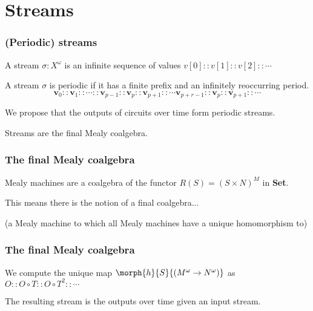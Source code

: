 \section{Streams}

\begin{frame}
    \frametitle{(Periodic) streams}

    \pause

    A stream $\sigma : X^\omega$ is an \alert{infinite sequence} of values $v[0] :: v[1] :: v[2] :: \cdots$

    \pause

    A stream $\sigma$ is \alert{periodic} if it has a finite \alert{prefix} and an infinitely reoccurring \alert{period}.
    \[ \textbf{v}_0 :: \textbf{v}_1 :: \cdots :: \textbf{v}_{p-1} :: \textbf{v}_{p} :: \textbf{v}_{p+1} :: \cdots \textbf{v}_{p+r-1} :: \textbf{v}_{p} :: \textbf{v}_{p+1} :: \cdots\]
    
    \pause

    We propose that the outputs of circuits over time form \alert{periodic streams}.

    \pause

    Streams are the \alert{final Mealy coalgebra}.

\end{frame}

\begin{frame}
    \frametitle{The final Mealy coalgebra}

    \pause

    Mealy machines are a \alert{coalgebra} of the functor $R(S) = (S \times N)^M$ in \textbf{Set}.

    \pause

    This means there is the notion of a \alert{final coalgebra}...

    (a Mealy machine to which all Mealy machines have a unique homomorphism to)

\end{frame}

\begin{frame}
    \frametitle{The final Mealy coalgebra}

    \pause

    \begin{center}
        
    \end{center}

    We compute the \alert{unique map} $\morph{h}{S}{(M^\omega \to N^\omega)}$ as $O :: O \circ T :: O \circ T^2 :: \cdots$

    \pause

    The resulting stream is the \alert{outputs over time} given an \alert{input stream}.


\end{frame}

